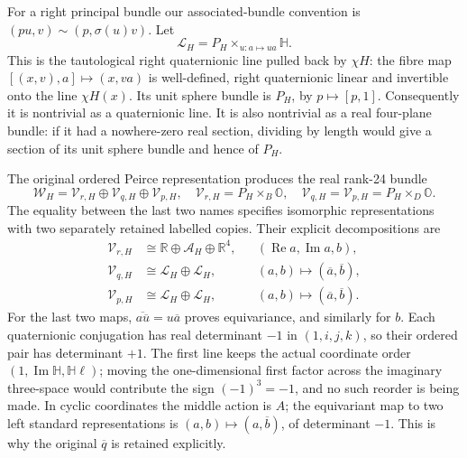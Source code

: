 \documentclass[11pt]{article}
\theoremstyle{definition}
\begin{document}
For a right principal bundle our associated-bundle convention is
$(p u,v)\sim(p,\sigma(u)v)$. Let
\[
 \mathcal L_H=P_H\times_{u:a\mapsto u a}\mathbb H.
\]
This is the tautological right quaternionic line pulled back by
$\chi H$: the fibre map $[(x,v),a]\mapsto (x,v a)$ is
well-defined, right quaternionic linear and invertible onto the
line $\chi H(x)$. Its unit sphere bundle is $P_H$, by
$p\mapsto[p,1]$. Consequently it is nontrivial as a quaternionic
line. It is also nontrivial as a real four-plane bundle: if it had
a nowhere-zero real section, dividing by length would give a
section of its unit sphere bundle and hence of $P_H$.

The original ordered Peirce representation produces the real
rank-24 bundle
\begin{equation}
 \mathcal W_H=\mathcal V_{r,H}\oplus\mathcal V_{q,H}
                              \oplus\mathcal V_{p,H},
 \quad
 \mathcal V_{r,H}=P_H\times_B\mathbb O,
 \quad
 \mathcal V_{q,H}=\mathcal V_{p,H}=P_H\times_D\mathbb O.
 \label{rettri:W}
\end{equation}
The equality between the last two names specifies isomorphic
representations with two separately retained labelled copies.
Their explicit decompositions are
\begin{equation}
 \begin{aligned}
 \mathcal V_{r,H}&\cong
       \mathbb R\oplus\mathcal A_H\oplus\mathbb R^4,
       &&(\operatorname{Re}a,\operatorname{Im}a,b),\\
 \mathcal V_{q,H}&\cong\mathcal L_H\oplus\mathcal L_H,
       &&(a,b)\longmapsto(\overline a,\overline b),\\
 \mathcal V_{p,H}&\cong\mathcal L_H\oplus\mathcal L_H,
       &&(a,b)\longmapsto(\overline a,\overline b).
 \end{aligned}
 \label{rettri:splittings}
\end{equation}
For the last two maps,
$\overline{a\overline u}=u\overline a$ proves equivariance,
and similarly for $b$. Each quaternionic conjugation has real
determinant $-1$ in $(1,i,j,k)$, so their ordered pair has
determinant $+1$. The first line keeps the actual coordinate order
$(1,\operatorname{Im}\mathbb H,\mathbb H\ell)$; moving the
one-dimensional first factor across the imaginary three-space
would contribute the sign $(-1)^3=-1$, and no such reorder is
being made. In cyclic coordinates the middle action is $A$;
the equivariant map to two left standard representations is
$(a,b)\mapsto(a,\overline b)$, of determinant $-1$. This is
why the original $\overline q$ is retained explicitly.
\end{document}
